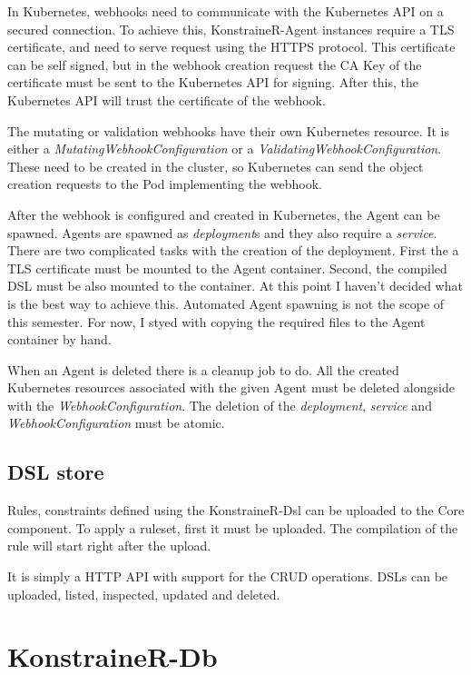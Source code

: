 In Kubernetes, webhooks need to communicate with the Kubernetes API on a secured connection. To achieve this, KonstraineR-Agent instances require a TLS certificate, and need to serve request using the HTTPS protocol. This certificate can be self signed, but in the webhook creation request the CA Key of the certificate must be sent to the Kubernetes API for signing. After this, the Kubernetes API will trust the certificate of the webhook.

The mutating or validation webhooks have their own Kubernetes resource. It is either a \emph{MutatingWebhookConfiguration} or a \emph{ValidatingWebhookConfiguration}. These need to be created in the cluster, so Kubernetes can send the object creation requests to the Pod implementing the webhook.

After the webhook is configured and created in Kubernetes, the Agent can be spawned. Agents are spawned as \emph{deployment}s and they also require a \emph{service}. There are two complicated tasks with the creation of the deployment. First the a TLS certificate must be mounted to the Agent container. Second, the compiled DSL must be also mounted to the container. At this point I haven't decided what is the best way to achieve this. Automated Agent spawning is not the scope of this semester. For now, I styed with copying the required files to the Agent container by hand.

When an Agent is deleted there is a cleanup job to do. All the created Kubernetes resources associated with the given Agent must be deleted alongside with the \emph{WebhookConfiguration}. The deletion of the \emph{deployment}, \emph{service} and \emph{WebhookConfiguration} must be atomic.

\subsection{DSL store}

Rules, constraints defined using the KonstraineR-Dsl can be uploaded to the Core component. To apply a ruleset, first it must be uploaded. The compilation of the rule will start right after the upload.

It is simply a HTTP API with support for the CRUD operations. DSLs can be uploaded, listed, inspected, updated and deleted.

\section{KonstraineR-Db}

